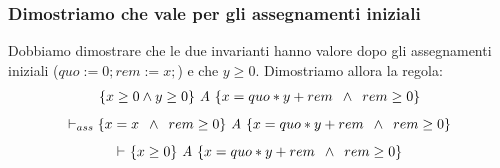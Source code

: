 \begin{esempio}
				      					\subsubsection{Dimostriamo che vale per gli assegnamenti iniziali}
				      					Dobbiamo dimostrare che le due invarianti hanno valore dopo gli assegnamenti iniziali ($quo := 0; rem := x;$) e che $y\geq0$. 
				      					Dimostriamo allora la regola:
				      					\begin{align}
				      						\{x\geq 0 \land y\geq 0\}\mbox{ \textit{A} }\{x=quo*y + rem\,\,\,\land\,\,\,rem \geq 0\} 
				      						\label{ToCheck2}                                                                         
				      					\end{align}
				      					\[\vdash_{ass}\{x=x\,\,\,\land\,\,\,rem \geq 0\}\mbox{ \textit{A} }\{x=quo*y + rem\,\,\,\land\,\,\,rem \geq 0\}\]
				      					\[\vdash_{}\{x \geq 0\}\mbox{ \textit{A} }\{x=quo*y + rem\,\,\,\land\,\,\,rem \geq 0\}\]
				      				\end{esempio}
